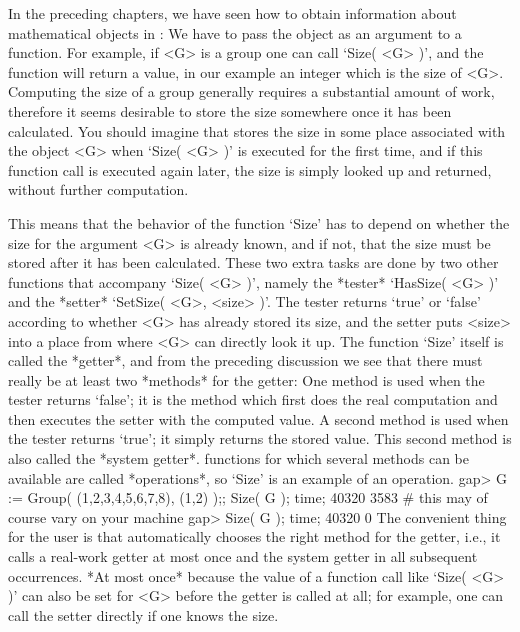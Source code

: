 



In the  preceding chapters, we have  seen how to obtain information about
mathematical objects in {\GAP}: We have to pass the object as an argument
to a function. For example, if <G> is a group one can call
`Size( <G> )', and the function will return a value,
in our example an integer  which is the  size of <G>. Computing
the size  of a  group generally  requires  a substantial amount  of work,
therefore it seems desirable to store the size somewhere once it has been
calculated. You should imagine that {\GAP} stores  the size in some place
associated  with the object  <G> when `Size( <G>  )'  is executed for the
first time, and if this function  call is executed  again later, the size
is simply looked up and returned, without further computation.

%
%
This means that the  behavior  of the  function  `Size' has to  depend on
whether the size for the argument <G> is already known,  and if not, that
the size  must be  stored after it  has been  calculated. These two extra
tasks are  done  by two other   functions that accompany `Size(   <G> )',
namely the *tester* `HasSize( <G> )'
and the *setter* `SetSize( <G>, <size> )'.
The tester returns `true' or `false' according to
whether <G> has already stored its size, and the setter puts <size> into
a place from where <G> can directly look it up.
The function `Size' itself is called the *getter*,
and from the preceding discussion we see
that there must really be at least two *methods* for the getter:
One method is used when the tester returns `false';
it is the method which first does the real computation and then executes
the setter with the computed value.
A second method is used when the tester returns `true';
it simply returns the stored value.
This second method is also called the *system getter*.
{\GAP} functions for which several methods can be available
are called *operations*, so `Size' is an example of an operation.
\beginexample
gap> G := Group( (1,2,3,4,5,6,7,8), (1,2) );; Size( G ); time;
40320
3583   # this may of course vary on your machine
gap> Size( G ); time;
40320
0
\endexample
The convenient thing  for the user  is that  {\GAP} automatically chooses
the right method  for the getter, i.e.,  it calls a real-work getter at
most once  and the system getter  in all subsequent occurrences. *At most
once* because the value of a function call like `Size( <G> )' can also be
set for <G>  before the getter  is called at all;
for example, one can call the setter directly if one knows the size.

